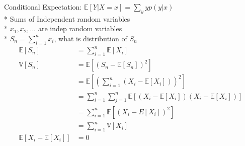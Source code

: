 \documentclass{article}
\begin{document}
Conditional Expectation: $\mathbb{E}\left[Y | X = x\right] = \displaystyle\sum_{y} y p\left(y | x\right) $
\\* Sums of Independent random variables
\\* $x_{1}, x_{2}, ...$ are indep random variables
\\* $S_{n} = \displaystyle\sum_{i=1}^{n} x_{i}$, what is distribution of $S_{n}$
\begin{align*}
\mathbb{E}\left[S_{n}\right] &= \displaystyle\sum_{i=1}^{n} \mathbb{E}\left[X_{i}\right]
\\ \mathbb{V}\left[S_{n}\right] &= \mathbb{E}\left[\left(S_{n} - \mathbb{E}\left[S_{n}\right]\right)^{2}\right]
\\ &= \mathbb{E}\left[\left(\displaystyle\sum_{i=1}^{n} \left(X_{i} - \mathbb{E}\left[X_{i}\right]\right)\right)^{2}\right]
\\ &= \displaystyle\sum_{i=1}^{n} \displaystyle\sum_{j=1}^{n} \mathbb{E}\left[\left(X_{i} - \mathbb{E}\left[X_{i}\right]\right)\left(X_{i} - \mathbb{E}\left[X_{i}\right]\right)\right]
\\ &= \displaystyle\sum_{i=1}^{n} \mathbb{E}\left[\left(X_{i} - E\left[X_{i}\right]\right)^{2}\right]
\\ &= \displaystyle\sum_{i=1}^{n} \mathbb{V}\left[X_{i}\right]
\\ \mathbb{E}\left[X_{i} - \mathbb{E}\left[X_{i}\right]\right] &= 0
\end{align*}
\end{document}
